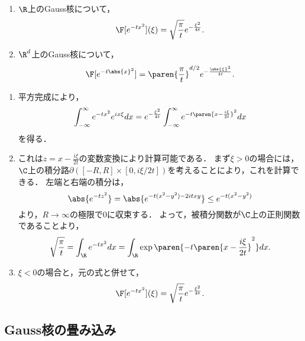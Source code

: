 \documentclass[uplatex,dvipdfmx]{jsreport}
\begin{document}
\begin{theorem}\mbox{}\label{thm-Fourier-transform-of-Gaussian-density}
    \begin{enumerate}
        \item $\R$上のGauss核について，\[\F[e^{-tx^2}](\xi)=\sqrt{\frac{\pi}{t}}e^{-\frac{\xi^2}{4t}}.\]
        \item $\R^d$上のGauss核について，
        \[\F[e^{-t\abs{x}^2}]=\paren{\frac{\pi}{t}}^{d/2}e^{-\frac{\abs{\xi}^2}{4t}}.\]
    \end{enumerate}
\end{theorem}
\begin{Proof}\mbox{}
    \begin{enumerate}[{Step}1]
        \item 平方完成により，
        \begin{align*}
            \int^\infty_{-\infty}e^{-tx^2}e^{ix\xi}dx=e^{-\frac{\xi^2}{4t}}\int^\infty_{-\infty}e^{-t\paren{x-\frac{i\xi}{2t}}^2}dx
        \end{align*}
        を得る．
        \item これは$z=x-\frac{i\xi}{2t}$の変数変換により計算可能である．
        まず$\xi>0$の場合には，
        $\C$上の積分路$\partial([-R,R]\times[0,i\xi/2t])$を考えることにより，これを計算できる．
        左端と右端の積分は，
        \[\abs{e^{-tz^2}}=\abs{e^{-t(x^2-y^2)-2itxy}}\le e^{-t(x^2-y^2)}\]
        より，$R\to\infty$の極限で$0$に収束する．
        よって，被積分関数が$\C$上の正則関数であることより，
        \[\sqrt{\frac{\pi}{t}}=\int_\R e^{-tx^2}dx=\int_\R \exp\paren{-t\paren{x-\frac{i\xi}{2t}}^2}dx.\]
        \item $\xi<0$の場合と，元の式と併せて，
        \[\F[e^{-tx^2}](\xi)=\sqrt{\frac{\pi}{t}}e^{-\frac{\xi^2}{4t}}.\]
    \end{enumerate}
\end{Proof}

\subsection{Gauss核の畳み込み}
\end{document}
